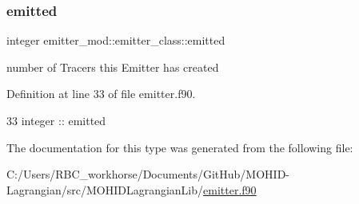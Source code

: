 \subsubsection{\texorpdfstring{emitted}{emitted}}
{\footnotesize\ttfamily integer emitter\+\_\+mod\+::emitter\+\_\+class\+::emitted\hspace{0.3cm}{\ttfamily [private]}}



number of Tracers this Emitter has created 



Definition at line 33 of file emitter.\+f90.


\begin{DoxyCode}
33         \textcolor{keywordtype}{integer} :: emitted
\end{DoxyCode}


The documentation for this type was generated from the following file\+:\begin{DoxyCompactItemize}
\item 
C\+:/\+Users/\+R\+B\+C\+\_\+workhorse/\+Documents/\+Git\+Hub/\+M\+O\+H\+I\+D-\/\+Lagrangian/src/\+M\+O\+H\+I\+D\+Lagrangian\+Lib/\mbox{\hyperlink{emitter_8f90}{emitter.\+f90}}\end{DoxyCompactItemize}
